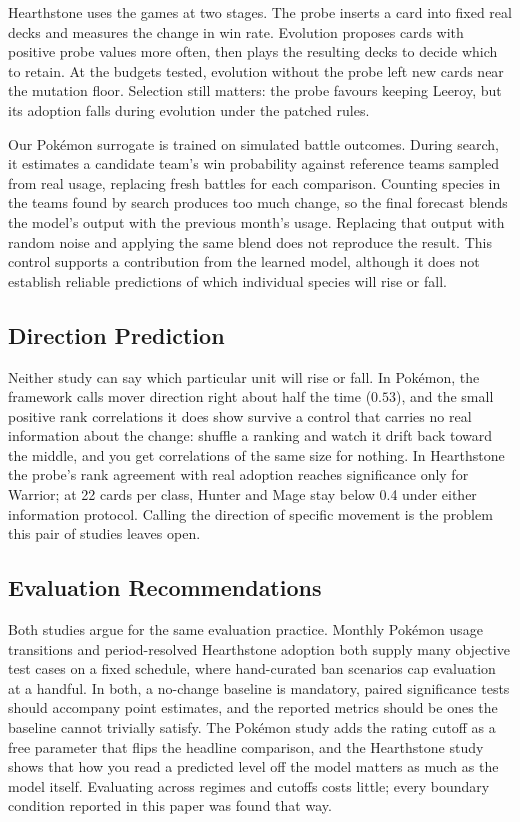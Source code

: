 \documentclass[journal]{IEEEtran}
\newcommand{\pkmn}{Pok\'emon}
\begin{document}
Hearthstone uses the games at two stages. The probe inserts a card into
fixed real decks and measures the change in win rate. Evolution proposes
cards with positive probe values more often, then plays the resulting
decks to decide which to retain. At the budgets tested, evolution without
the probe left new cards near the mutation floor. Selection still matters:
the probe favours keeping Leeroy, but its adoption falls during evolution
under the patched rules.

Our \pkmn{} surrogate is trained on simulated battle outcomes. During
search, it estimates a candidate team's win probability against reference
teams sampled from real usage, replacing fresh battles for each
comparison. Counting species in the teams found by search produces too
much change, so the final forecast blends the model's output with the
previous month's usage. Replacing that output with random noise and
applying the same blend does not reproduce the result. This control
supports a contribution from the learned model, although it does not
establish reliable predictions of which individual species will rise or
fall.

\subsection{Direction Prediction}
Neither study can say which particular unit will rise or fall. In \pkmn{},
the framework calls mover direction right about half the time ($0.53$), and the small
positive rank correlations it does show survive a control that carries no
real information about the change: shuffle a ranking and watch it drift back
toward the middle, and you get correlations of the same size for nothing.
In Hearthstone the probe's rank agreement with real adoption reaches
significance only for Warrior; at 22 cards per class, Hunter and Mage
stay below 0.4 under either information protocol. Calling the direction of specific movement is the problem this pair of
studies leaves open.

\subsection{Evaluation Recommendations}
Both studies argue for the same evaluation practice. Monthly \pkmn{} usage
transitions and period-resolved Hearthstone adoption both supply
many objective test cases on a fixed schedule, where hand-curated ban
scenarios cap evaluation at a handful. In both, a no-change baseline is
mandatory, paired significance tests should accompany point estimates, and
the reported metrics should be ones the baseline cannot trivially satisfy.
The \pkmn{} study adds the rating cutoff as a free parameter that flips the
headline comparison, and the Hearthstone study shows that how you read a predicted level off
the model matters as much as the model itself. Evaluating across regimes and cutoffs costs little; every boundary condition reported in this paper was found that way.
\end{document}
